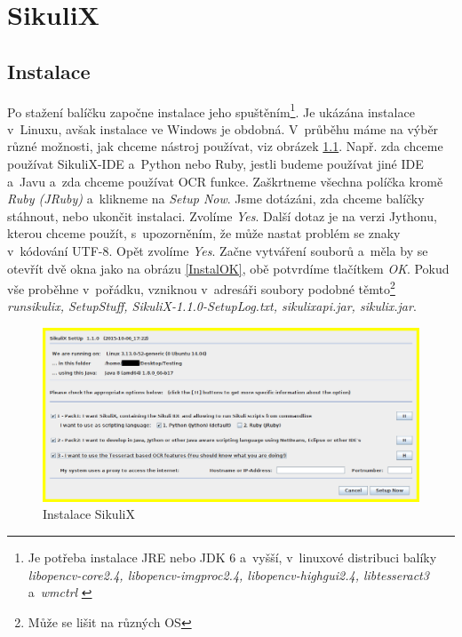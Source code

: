 \chapter{SikuliX}
	\section{Instalace}
	Po stažení balíčku započne instalace jeho spuštěním\footnote{Je potřeba instalace JRE nebo JDK 6 a~vyšší, v~linuxové distribuci balíky \emph{libopencv-core2.4, libopencv-imgproc2.4, libopencv-highgui2.4, libtesseract3} a~\emph{wmctrl} \citep{SikuliX}}. Je ukázána instalace v~Linuxu, avšak instalace ve Windows je obdobná. V~průběhu máme na výběr různé možnosti, jak chceme nástroj používat, viz obrázek \ref{Instal}. Např. zda chceme používat SikuliX-IDE a~Python nebo Ruby, jestli budeme používat jiné IDE a~Javu a~zda chceme používat OCR funkce. Zaškrtneme všechna políčka kromě \emph{Ruby (JRuby)} a~klikneme na \emph{Setup Now}. Jsme dotázáni, zda chceme balíčky stáhnout, nebo ukončit instalaci. Zvolíme \emph{Yes}. Další dotaz je na verzi Jythonu, kterou chceme použít, s~upozorněním, že může nastat problém se znaky v~kódování UTF-8. Opět zvolíme \emph{Yes}. Začne vytváření souborů a~měla by se otevřít dvě okna jako na obrázu \ref{InstalOK}, obě potvrdíme tlačítkem \emph{OK}. Pokud vše proběhne v~pořádku, vzniknou v~adresáři soubory podobné těmto\footnote{Může se lišit na různých OS} \emph{runsikulix, SetupStuff, SikuliX-1.1.0-SetupLog.txt, sikulixapi.jar, sikulix.jar}.
	\begin{figure}[ht!]
		\centering
		\includegraphics[width=13.5cm]{img/Instalace/Instalace.png}
		\caption{Instalace SikuliX}
		\label{Instal}
	\end{figure}

